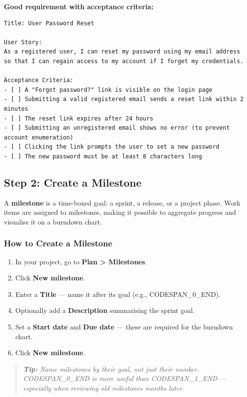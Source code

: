 \documentclass[11pt,a4paper]{book}
\begin{document}
\textbf{Good requirement with acceptance criteria:}

\begin{lstlisting}
Title: User Password Reset

User Story:
As a registered user, I can reset my password using my email address
so that I can regain access to my account if I forget my credentials.

Acceptance Criteria:
- [ ] A "Forgot password?" link is visible on the login page
- [ ] Submitting a valid registered email sends a reset link within 2 minutes
- [ ] The reset link expires after 24 hours
- [ ] Submitting an unregistered email shows no error (to prevent account enumeration)
- [ ] Clicking the link prompts the user to set a new password
- [ ] The new password must be at least 8 characters long
\end{lstlisting}

\medskip

\subsection{Step 2: Create a Milestone}

A \textbf{milestone} is a time-boxed goal: a sprint, a release, or a project phase. Work items are assigned to milestones, making it possible to aggregate progress and visualise it on a burndown chart.

\subsubsection{How to Create a Milestone}

\begin{enumerate}
  \item In your project, go to \textbf{Plan > Milestones}.
  \item Click \textbf{New milestone}.
  \item Enter a \textbf{Title} --- name it after its goal (e.g., CODESPAN\_0\_END).
  \item Optionally add a \textbf{Description} summarising the sprint goal.
  \item Set a \textbf{Start date} and \textbf{Due date} --- these are required for the burndown chart.
  \item Click \textbf{New milestone}.
\end{enumerate}

\begin{quote}
\textit{\textbf{Tip:} Name milestones by their goal, not just their number. CODESPAN\_0\_END is more useful than CODESPAN\_1\_END --- especially when reviewing old milestones months later.}
\end{quote}
\end{document}
